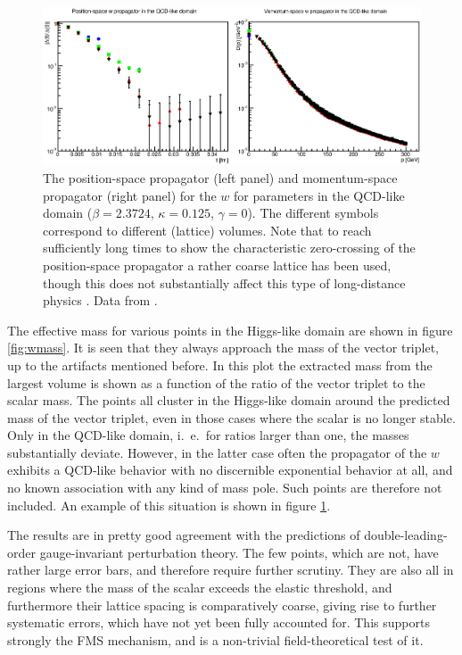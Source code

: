 \documentclass[final,twoside,12pt]{article}
\newcommand*{\1}{1\!\!\!\bot}
\begin{document}
\begin{figure}
\includegraphics[width=\linewidth]{w-qcd}
\caption{\label{fig:w-qcd}The position-space propagator (left panel) and momentum-space propagator (right panel) for the $w$ for parameters in the QCD-like domain ($\beta=2.3724$, $\kappa=0.125$, $\gamma=0$). The different symbols correspond to different (lattice) volumes. Note that to reach sufficiently long times to show the characteristic zero-crossing of the position-space propagator a rather coarse lattice has been used, though this does not substantially affect this type of long-distance physics \cite{Maas:2011se}. Data from \cite{Maas:unpublished}.}
\end{figure}

The effective mass for various points in the Higgs-like domain are shown in figure \ref{fig:wmass}. It is seen that they always approach the mass of the vector triplet, up to the artifacts mentioned before. In this plot the extracted mass from the largest volume is shown as a function of the ratio of the vector triplet to the scalar mass. The points all cluster in the Higgs-like domain around the predicted mass of the vector triplet, even in those cases where the scalar is no longer stable. Only in the QCD-like domain, i.\ e.\ for ratios larger than one, the masses substantially deviate. However, in the latter case often the propagator of the $w$ exhibits a QCD-like behavior \cite{Maas:2011se} with no discernible exponential behavior at all, and no known association with any kind of mass pole. Such points are therefore not included. An example of this situation is shown in figure \ref{fig:w-qcd}.

The results are in pretty good agreement with the predictions of double-leading-order gauge-invariant perturbation theory. The few points, which are not, have rather large error bars, and therefore require further scrutiny. They are also all in regions where the mass of the scalar exceeds the elastic threshold, and furthermore their lattice spacing is comparatively coarse, giving rise to further systematic errors, which have not yet been fully accounted for. This supports strongly the FMS mechanism, and is a non-trivial field-theoretical test of it.
\end{document}
